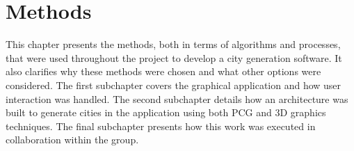 \chapter{Methods}

This chapter presents the methods, both in terms of algorithms and processes, that were used throughout the project to develop a city generation software.
It also clarifies why these methods were chosen and what other options were considered.
The first subchapter covers the graphical application and how user interaction was handled.
The second subchapter details how an architecture was built to generate cities in the application using both PCG and 3D graphics techniques.
The final subchapter presents how this work was executed in collaboration within the group.



